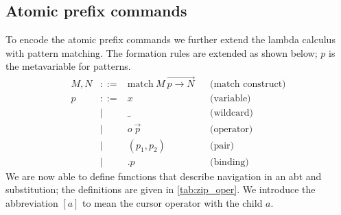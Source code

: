 \documentclass[sigplan,review]{acmart}
\newcommand{\abt}{\textsf{abt}\xspace}
\begin{document}

\subsection{Atomic prefix commands}

To encode the atomic prefix commands we further extend the lambda
calculus with pattern matching. The formation rules are extended as
shown below; $p$ is the metavariable for patterns.
\begin{align*}
    M, N & ::= & \text{match}\ M\ \overrightarrow{p \to N} && \text{(match construct)}
    \\
    p & ::= & x              & & \text{(variable)} \\
      & |   & \_             && \text{(wildcard)} \\
      & |   & o\ \Vec{p}     && \text{(operator)} \\
      & |   & (p_1, p_2)     && \text{(pair)} \\
         & |   & .p             && \text{(binding)}
\end{align*}
%
We are now able to define functions that describe navigation in an
\abt and substitution; the definitions are given in
\cref{tab:zip_oper}. We introduce the abbreviation $[a]$ to mean the
cursor operator with the child $a$.
\end{document}
